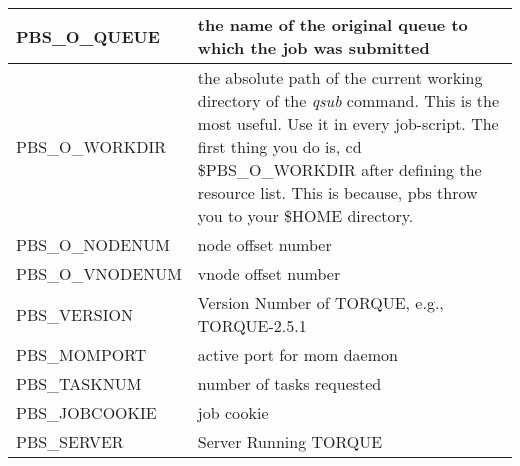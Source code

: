 \begin{tabular}{|p{}|p{}|}
PBS\_O\_QUEUE    & the name of the original queue to which the job was submitted \\ \hline
PBS\_O\_WORKDIR  & the absolute path of the current working directory of the \emph{qsub} command. This is the most useful. Use it in every job-script. The first thing you do is, cd \$PBS\_O\_WORKDIR after defining the resource list. This is because, pbs throw you to your \$HOME directory. \\ \hline
PBS\_O\_NODENUM  & node offset number \\ \hline
PBS\_O\_VNODENUM & vnode offset number \\ \hline
PBS\_VERSION     & Version Number of TORQUE, e.g., TORQUE-2.5.1 \\ \hline
PBS\_MOMPORT     & active port for mom daemon \\ \hline
PBS\_TASKNUM     & number of tasks requested \\ \hline
PBS\_JOBCOOKIE   & job cookie \\ \hline
PBS\_SERVER      & Server Running TORQUE \\ \hline
\end{tabular}

